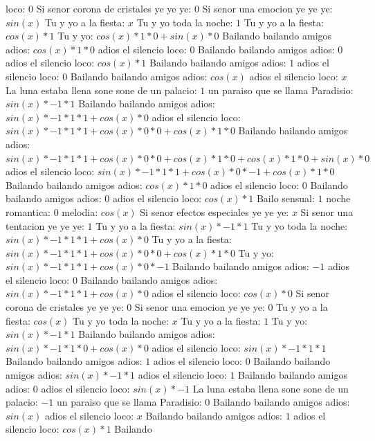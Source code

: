 \documentclass{article}
\begin{document}
loco: $0$ Si senor corona de cristales ye ye ye: $0$  \newline Si senor una emocion ye ye ye: $sin(x)$  \newline Tu y yo a la fiesta: $x$ Tu y yo toda la noche: $1$  \newline Tu y yo a la fiesta: $cos(x)*1$ Tu y yo: $cos(x)*1*0+sin(x)*0$ Bailando bailando amigos adios: $cos(x)*1*0$ adios el silencio loco: $0$ Bailando bailando amigos adios: $0$  \newline adios el silencio loco: $cos(x)*1$ Bailando bailando amigos adios: $1$ adios el silencio loco: $0$  \newline Bailando bailando amigos adios: $cos(x)$  \newline adios el silencio loco: $x$ La luna estaba llena sone sone de un palacio: $1$  \newline un paraiso que se llama Paradisio: $sin(x)*-1*1$ Bailando bailando amigos adios: $sin(x)*-1*1*1+cos(x)*0$ adios el silencio loco: ${sin(x)*-1*1*1+cos(x)*0}*0+cos(x)*1*0$ Bailando bailando amigos adios: ${sin(x)*-1*1*1+cos(x)*0}*0+cos(x)*1*0+cos(x)*1*0+sin(x)*0$ adios el silencio loco: ${sin(x)*-1*1*1+cos(x)*0}*-1+cos(x)*1*0$  \newline Bailando bailando amigos adios: $cos(x)*1*0$ adios el silencio loco: $0$ Bailando bailando amigos adios: $0$  \newline adios el silencio loco: $cos(x)*1$ Bailo sensual: $1$ noche romantica: $0$  \newline melodia: $cos(x)$  \newline Si senor efectos especiales ye ye ye: $x$ Si senor una tentacion ye ye ye: $1$  \newline Tu y yo a la fiesta: $sin(x)*-1*1$ Tu y yo toda la noche: $sin(x)*-1*1*1+cos(x)*0$ Tu y yo a la fiesta: ${sin(x)*-1*1*1+cos(x)*0}*0+cos(x)*1*0$ Tu y yo: ${sin(x)*-1*1*1+cos(x)*0}*-1$ Bailando bailando amigos adios: $-1$ adios el silencio loco: $0$  \newline Bailando bailando amigos adios: $sin(x)*-1*1*1+cos(x)*0$  \newline adios el silencio loco: $cos(x)*0$ Si senor corona de cristales ye ye ye: $0$ Si senor una emocion ye ye ye: $0$  \newline Tu y yo a la fiesta: $cos(x)$  \newline Tu y yo toda la noche: $x$ Tu y yo a la fiesta: $1$  \newline Tu y yo: $sin(x)*-1*1$ Bailando bailando amigos adios: $sin(x)*-1*1*0+cos(x)*0$ adios el silencio loco: $sin(x)*-1*1*1$ Bailando bailando amigos adios: $1$ adios el silencio loco: $0$  \newline Bailando bailando amigos adios: $sin(x)*-1*1$ adios el silencio loco: $1$ Bailando bailando amigos adios: $0$  \newline adios el silencio loco: $sin(x)*-1$ La luna estaba llena sone sone de un palacio: $-1$ un paraiso que se llama Paradisio: $0$  \newline Bailando bailando amigos adios: $sin(x)$  \newline adios el silencio loco: $x$ Bailando bailando amigos adios: $1$  \newline adios el silencio loco: $cos(x)*1$ Bailando 
\end{document}
